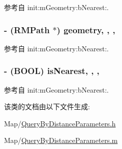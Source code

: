 参考自 init\-:m\-Geometry\-:b\-Nearest\-:.

\hypertarget{interface_query_by_distance_parameters_a4eeba7af45b232d8a0354f13e4e033b4}{
\subsubsection[{geometry}]{\setlength{\rightskip}{0pt plus 5cm}-\/ ({\bf R\-M\-Path} $\ast$) geometry\hspace{0.3cm}{\ttfamily [read]}, {\ttfamily [write]}, {\ttfamily [atomic]}, {\ttfamily [copy]}}}\label{interface_query_by_distance_parameters_a4eeba7af45b232d8a0354f13e4e033b4}


参考自 init\-:m\-Geometry\-:b\-Nearest\-:.

\hypertarget{interface_query_by_distance_parameters_a45bb2b68e940f017d2809a6ba9485a89}{
\subsubsection[{is\-Nearest}]{\setlength{\rightskip}{0pt plus 5cm}-\/ (B\-O\-O\-L) is\-Nearest\hspace{0.3cm}{\ttfamily [read]}, {\ttfamily [write]}, {\ttfamily [atomic]}, {\ttfamily [assign]}}}\label{interface_query_by_distance_parameters_a45bb2b68e940f017d2809a6ba9485a89}


参考自 init\-:m\-Geometry\-:b\-Nearest\-:.



该类的文档由以下文件生成\-:\begin{DoxyCompactItemize}
\item 
Map/\hyperlink{_query_by_distance_parameters_8h}{Query\-By\-Distance\-Parameters.\-h}\item 
Map/\hyperlink{_query_by_distance_parameters_8m}{Query\-By\-Distance\-Parameters.\-m}\end{DoxyCompactItemize}
